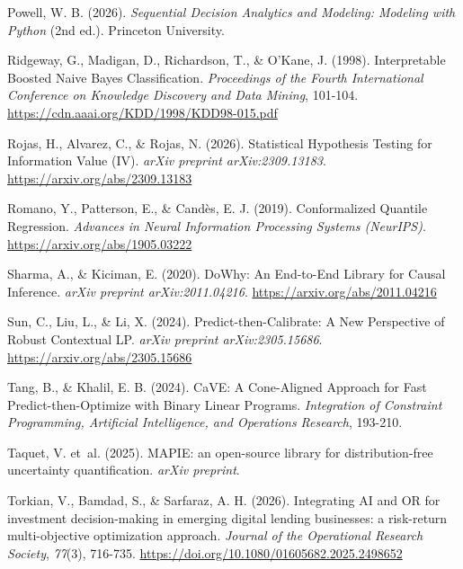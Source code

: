 \documentclass[
  spanish,
  11pt,
  letterpaper,
]{scrbook}
\newlength{\cslhangindent}
\newenvironment{CSLReferences}[2] %
 {\begin{list}{}{%
  \setlength{\itemindent}{0pt}
  \setlength{\leftmargin}{0pt}
  \setlength{\parsep}{0pt}
  \ifodd #1
   \setlength{\leftmargin}{\cslhangindent}
   \setlength{\itemindent}{-1\cslhangindent}
  \fi
  \setlength{\itemsep}{#2\baselineskip}}}
 {\end{list}}
\theoremstyle{plain}
\theoremstyle{remark}
\begin{document}
\begin{CSLReferences}{1}{0}
Powell, W. B. (2026). \emph{Sequential Decision Analytics and Modeling:
Modeling with {Python}} (2nd ed.). Princeton University.

Ridgeway, G., Madigan, D., Richardson, T., \& O'Kane, J. (1998).
Interpretable Boosted Naive Bayes Classification. \emph{Proceedings of
the Fourth International Conference on Knowledge Discovery and Data
Mining}, 101-104. \url{https://cdn.aaai.org/KDD/1998/KDD98-015.pdf}

Rojas, H., Alvarez, C., \& Rojas, N. (2026). Statistical Hypothesis
Testing for Information Value (IV). \emph{arXiv preprint
arXiv:2309.13183}. \url{https://arxiv.org/abs/2309.13183}

Romano, Y., Patterson, E., \& Candès, E. J. (2019). Conformalized
Quantile Regression. \emph{Advances in Neural Information Processing
Systems (NeurIPS)}. \url{https://arxiv.org/abs/1905.03222}

Sharma, A., \& Kiciman, E. (2020). DoWhy: An End-to-End Library for
Causal Inference. \emph{arXiv preprint arXiv:2011.04216}.
\url{https://arxiv.org/abs/2011.04216}

Sun, C., Liu, L., \& Li, X. (2024). Predict-then-Calibrate: A New
Perspective of Robust Contextual {LP}. \emph{arXiv preprint
arXiv:2305.15686}. \url{https://arxiv.org/abs/2305.15686}

Tang, B., \& Khalil, E. B. (2024). {CaVE}: A Cone-Aligned Approach for
Fast Predict-then-Optimize with Binary Linear Programs.
\emph{Integration of Constraint Programming, Artificial Intelligence,
and Operations Research}, 193-210.

{Taquet, V. et~al.} (2025). {MAPIE}: an open-source library for
distribution-free uncertainty quantification. \emph{arXiv preprint}.

Torkian, V., Bamdad, S., \& Sarfaraz, A. H. (2026). Integrating {AI} and
{OR} for investment decision-making in emerging digital lending
businesses: a risk-return multi-objective optimization approach.
\emph{Journal of the Operational Research Society}, \emph{77}(3),
716-735. \url{https://doi.org/10.1080/01605682.2025.2498652}


\end{CSLReferences}
\end{document}
